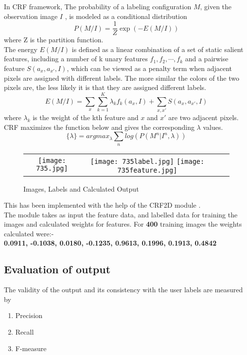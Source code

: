 \documentclass[11pt]{report}
\begin{document}
In CRF framework, The probability of a labeling configuration $M$, given the observation image $I$ , is modeled as a conditional distribution
\begin{equation}
P(M/I) = \frac{1}{Z}\exp{(-E(M/I))}
\end{equation}
where Z is the partition function. \\
The energy $E(M/I)$ is defined as a linear combination of a set of static salient features, including a number of k unary features $f_1, f_2,\cdots, f_k$ and a pairwise feature $S(a_x,a_{x'},I)$,
which can be viewed as a penalty term when adjacent pixels are assigned with different labels. The more similar the colors of the two pixels are, the less likely it is that they are assigned different labels.
\begin{equation}
E(M/I) = \sum _x\sum_{k=1}^{K} \lambda_{k}f_{k}(a_x,I) + \sum_{x,x'}S(a_x,a_{x'},I)
\end{equation}
where $\lambda_k$ is the weight of the kth feature and $x$ and $x'$ are two adjacent pixels. \\
CRF maximizes the function below and gives the corresponding $\lambda$ values.
\begin{equation}
\{\lambda\} = arg max_{\lambda}\sum _n log(P(M^n|I^n,\lambda))
\end{equation}

\begin{figure}[h!]
\center
\begin{tabular}{cccc}
\texttt{[image: 735.jpg]} 
& \texttt{[image: 735label.jpg]}
\hspace*{20pt}
\texttt{[image: 735feature.jpg]}
\end{tabular}
\label{tab:gt}
\caption{Images, Labels and Calculated Output}
\end{figure}
This has been implemented with the help of the CRF2D module \cite{crflearning}.\\
The module takes as input the feature data, and labelled data for training the images  and calculated weights for features.
For {\bf400} training images the weights calculated were:- \\
{\bf    0.0911, -0.1038, 0.0180, -0.1235, 0.9613, 0.1996, 0.1913, 0.4842}



\subsection*{Evaluation of output}
The validity of the output and its consistency with the user labels are measured by 
\begin{enumerate}
\item Precision
\item Recall
\item F-measure
\end{enumerate}
\end{document}
